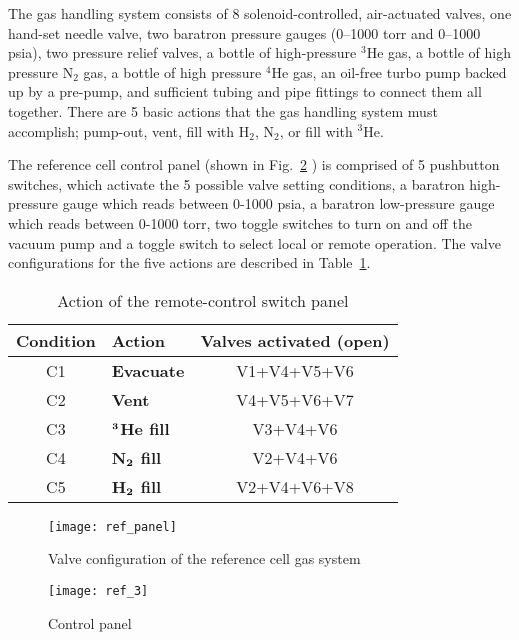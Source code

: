 {The gas handling system consists of 8 solenoid-controlled,
air-actuated valves, one hand-set needle valve, two baratron pressure
gauges (0--1000 torr and 0--1000 psia), two pressure relief valves, a
bottle of high-pressure $^3$He gas, a bottle of high pressure N$_2$
gas, a bottle of high pressure $^{4}$He gas, an oil-free turbo pump
backed up by a pre-pump, and sufficient tubing and pipe fittings to
connect them all together.  There are 5 basic actions that the gas
handling system must accomplish; pump-out, vent, fill with H$_2$, N$_2$, or 
fill with $^3$He. 

The reference cell control panel (shown in Fig.~\ref{fig:refcell3} )
is comprised of 5 pushbutton switches, which activate the 5 possible
valve setting conditions, a baratron high-pressure gauge which reads
between 0-1000 psia, a baratron low-pressure gauge which reads between
0-1000 torr, two toggle switches to turn on and off the vacuum pump
and a toggle switch to select local or remote operation.  The valve
configurations for the five actions are described in
Table~\ref{tab:refcell}.

\begin{table}
\begin{center}
\begin{tabular}{|c|l|c|}
\hline\hline
Condition & Action & Valves activated (open) \rule[-2.5mm]{0mm}{7mm}\\
\hline
C1 & {\bf Evacuate} & V1+V4+V5+V6 \\
C2 & {\bf Vent} & V4+V5+V6+V7 \\
C3 & {\bf $\bf ^3$He fill} & V3+V4+V6 \\
C4 & {\bf N$\bf _2$ fill } & V2+V4+V6 \\
C5 & {\bf H$\bf _2$ fill } & V2+V4+V6+V8 \\
\hline\hline
\end{tabular}
\caption{Action of the remote-control switch panel}
\label{tab:refcell}
\end{center}
\end{table}
\begin{figure}
\begin{center}
\centerline{ \texttt{[image: ref\_panel]}}
\caption{Valve configuration of the reference cell gas system}
\label{fig:refcell2}
\end{center}
\end{figure}

\begin{figure}
\begin{center}
\centerline{\texttt{[image: ref\_3]}}
\caption{Control panel}
\label{fig:refcell3}
\end{center}
\end{figure}


}

